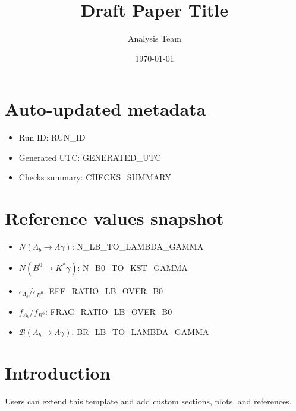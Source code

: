 \documentclass[11pt,a4paper]{article}
\title{Draft Paper Title}
\author{Analysis Team}
\date{\today}
\begin{document}
\maketitle

\section*{Auto-updated metadata}
\begin{itemize}
  \item Run ID: {{RUN_ID}}
  \item Generated UTC: {{GENERATED_UTC}}
  \item Checks summary: {{CHECKS_SUMMARY}}
\end{itemize}

\section*{Reference values snapshot}
\begin{itemize}
  \item $N(\Lambda_b \rightarrow \Lambda \gamma)$: {{N_LB_TO_LAMBDA_GAMMA}}
  \item $N(B^0 \rightarrow K^{*}\gamma)$: {{N_B0_TO_KST_GAMMA}}
  \item $\epsilon_{\Lambda_b}/\epsilon_{B^0}$: {{EFF_RATIO_LB_OVER_B0}}
  \item $f_{\Lambda_b}/f_{B^0}$: {{FRAG_RATIO_LB_OVER_B0}}
  \item $\mathcal{B}(\Lambda_b \rightarrow \Lambda \gamma)$: {{BR_LB_TO_LAMBDA_GAMMA}}
\end{itemize}

\section{Introduction}
Users can extend this template and add custom sections, plots, and references.
\end{document}
